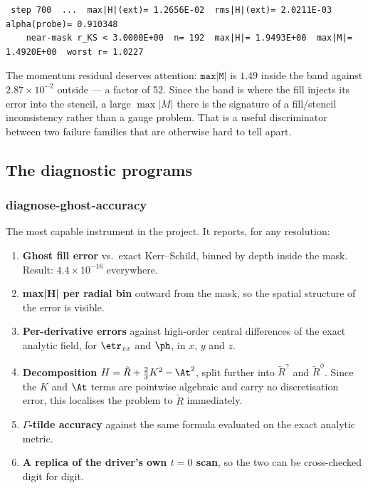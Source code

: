 \begin{lstlisting}
 step 700  ...  max|H|(ext)= 1.2656E-02  rms|H|(ext)= 2.0211E-03  alpha(probe)= 0.910348
    near-mask r_KS < 3.0000E+00  n= 192  max|H|= 1.9493E+00  max|M|= 1.4920E+00  worst r= 1.0227
\end{lstlisting}

The momentum residual deserves attention: $\texttt{max|M|}$ is $1.49$ inside
the band against $2.87\times10^{-2}$ outside --- a factor of 52. Since the band
is where the fill injects its error into the stencil, a large $\max|M|$ there
is the signature of a fill/stencil inconsistency rather than a gauge problem.
That is a useful discriminator between two failure families that are otherwise
hard to tell apart.

\subsection{The diagnostic programs}

\subsubsection{diagnose-ghost-accuracy}

The most capable instrument in the project. It reports, for any resolution:

\begin{enumerate}
\item \textbf{Ghost fill error} vs.\ exact Kerr--Schild, binned by depth inside
      the mask. Result: $4.4\times10^{-16}$ everywhere.
\item \textbf{max|H| per radial bin} outward from the mask, so the spatial
      structure of the error is visible.
\item \textbf{Per-derivative errors} against high-order central differences of
      the exact analytic field, for $\etr_{xx}$ and $\ph$, in $x$, $y$ and $z$.
\item \textbf{Decomposition} $H = \tilde{R} + \tfrac23 K^2 - \At^2$, split
      further into $\tilde{R}^\gamma$ and $\tilde{R}^\phi$. Since the $K$ and
      $\At$ terms are pointwise algebraic and carry no discretisation error,
      this localises the problem to $\tilde{R}$ immediately.
\item \textbf{$\Gamma$-tilde accuracy} against the same formula evaluated on
      the exact analytic metric.
\item \textbf{A replica of the driver's own $t=0$ scan}, so the two can be
      cross-checked digit for digit.
\end{enumerate}

